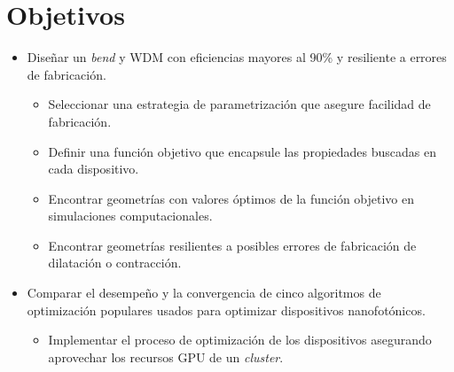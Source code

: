\section{Objetivos}

\begin{itemize}

  \item Diseñar un \emph{bend} y WDM con eficiencias mayores al 90\% y resiliente a errores de fabricación.

  \begin{itemize}

    \item Seleccionar una estrategia de parametrización que asegure facilidad de fabricación.

    \item Definir una función objetivo que encapsule las propiedades buscadas en cada dispositivo.

    \item Encontrar geometrías con valores óptimos de la función objetivo en simulaciones computacionales.

    \item Encontrar geometrías resilientes a posibles errores de fabricación de dilatación o contracción.

  \end{itemize}

  \item Comparar el desempeño y la convergencia de cinco algoritmos de optimización populares usados para optimizar dispositivos nanofotónicos.

  \begin{itemize}

    \item Implementar el proceso de optimización de los dispositivos asegurando aprovechar los
      recursos GPU de un \emph{cluster}.

  \end{itemize}

\end{itemize}





